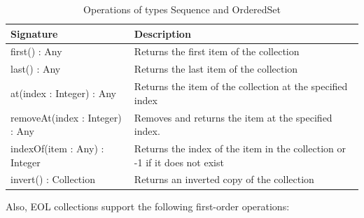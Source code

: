 \begin{longtable} {|p{5.5cm}|p{6.5cm}|}
			
			\caption{Operations of types Sequence and OrderedSet}
			\label{tab:SortedOperations}\\
			
			\hline
							
			\textbf{Signature} & \textbf{Description} \\\hline

			first() : Any & Returns the first item of the collection  \\\hline
				
			last() : Any & Returns the last item of the collection  \\\hline
	
			at(index : Integer) : Any & Returns the item of the collection at the specified index \\\hline
			
			removeAt(index : Integer) : Any & Removes and returns the item at the specified index. \\\hline
			
			indexOf(item : Any) : Integer & Returns the index of the item in the collection or -1 if it does not exist \\\hline

			invert() : Collection & Returns an inverted copy of the collection\\\hline
						
\end{longtable}

Also, EOL collections support the following first-order operations:

